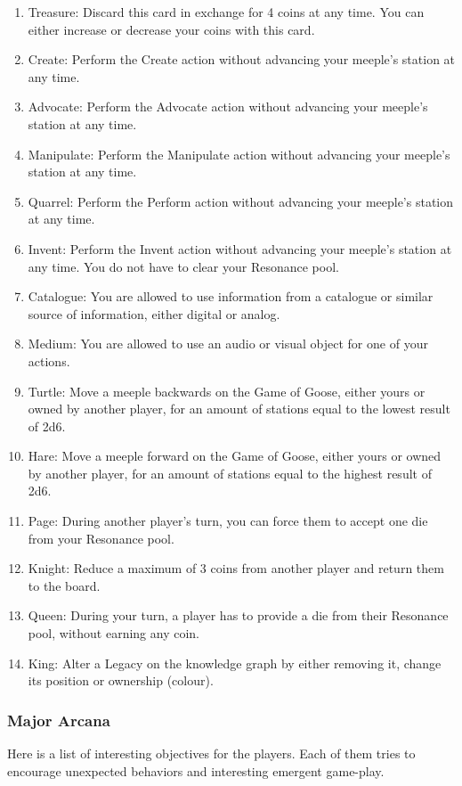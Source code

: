 \documentclass{article}
\begin{document}
\begin{multicols}{2}
\begin{enumerate}
\item Treasure: Discard this card in exchange for 4 coins at any time. You can either increase or decrease your coins with this card.
\item Create: Perform the Create action without advancing your meeple's station at any time.
\item Advocate: Perform the Advocate action without advancing your meeple's station at any time.
\item Manipulate: Perform the Manipulate action without advancing your meeple's station at any time.
\item Quarrel: Perform the Perform action without advancing your meeple's station at any time.
\item Invent: Perform the Invent action without advancing your meeple's station at any time. You do not have to clear your Resonance pool.
\item Catalogue: You are allowed to use information from a catalogue or similar source of information, either digital or analog.
\item Medium: You are allowed to use an audio or visual object for one of your actions.
\item Turtle: Move a meeple backwards on the Game of Goose, either yours or owned by another player, for an amount of stations equal to the lowest result of 2d6.
\item Hare: Move a meeple forward on the Game of Goose, either yours or owned by another player, for an amount of stations equal to the highest result of 2d6.
\item Page: During another player's turn, you can force them to accept one die from your Resonance pool.
\item Knight: Reduce a maximum of 3 coins from another player and return them to the board.
\item Queen: During your turn, a player has to provide a die from their Resonance pool, without earning any coin.
\item King: Alter a Legacy on the knowledge graph by either removing it, change its position or ownership (colour).
\end{enumerate}

\subsubsection{Major Arcana}

Here is a list of interesting objectives for the players. Each of them tries to encourage unexpected behaviors and interesting emergent game-play.


\end{multicols}
\end{document}
